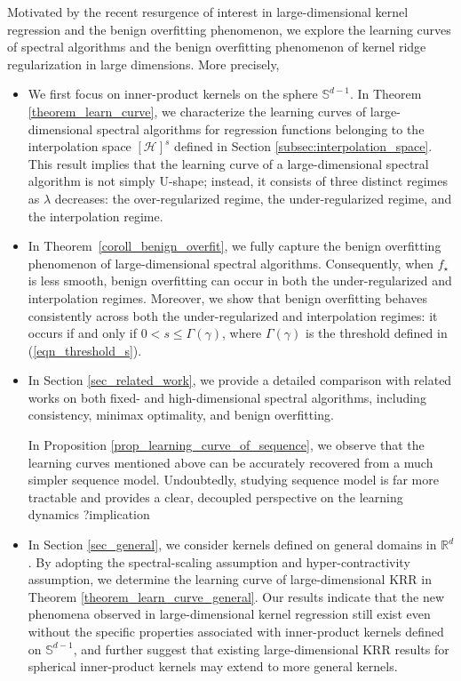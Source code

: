 \documentclass{article}
\theoremstyle{plain}
\theoremstyle{definition}
\theoremstyle{remark}
\newcommand{\calH}{\mathcal{H}}
\begin{document}
Motivated by the recent resurgence of interest in large-dimensional kernel regression and the benign overfitting phenomenon, we explore the learning curves of spectral algorithms and the benign overfitting phenomenon of kernel ridge regularization in large dimensions.  
More precisely,
\begin{itemize}
    \item We first focus on inner-product kernels on the sphere $\mathbb{S}^{d-1}$. 
    In Theorem \ref{theorem_learn_curve}, we characterize the learning curves of large-dimensional spectral algorithms for regression functions belonging to the interpolation space $[\calH]^{s}$ defined in Section \ref{subsec:interpolation_space}. 
    This result implies that the learning curve of a large-dimensional spectral algorithm is not simply U-shape; instead, it consists of three distinct regimes as $\lambda$ decreases: the over-regularized regime, the under-regularized regime, and the interpolation regime.

    \item In Theorem~\ref{coroll_benign_overfit}, we fully capture the benign overfitting phenomenon of large-dimensional spectral algorithms. 
    Consequently, when $f_{\star}$ is less smooth, benign overfitting can occur in both the under-regularized and interpolation regimes. 
    Moreover, we show that benign overfitting behaves consistently across both the under-regularized and interpolation regimes: it occurs if and only if $0<s \leq \Gamma(\gamma)$, where $\Gamma(\gamma)$ is the threshold defined in (\ref{eqn_threshold_s}).

    \item 
    In Section \ref{sec_related_work}, we provide a detailed comparison with related works on both fixed- and high-dimensional spectral algorithms, including consistency, minimax optimality, and benign overfitting. 
   
        In Proposition \ref{prop_learning_curve_of_sequence}, we observe that the learning curves mentioned above can be accurately recovered from a much simpler sequence model.
        Undoubtedly, studying sequence model is far more tractable and provides a clear, decoupled perspective on the learning dynamics  
    {\color{red} ?implication}
    

    \item In Section \ref{sec_general}, we consider kernels defined on general domains in $\mathbb{R}^{d}$. By adopting the spectral-scaling assumption and hyper-contractivity assumption, we determine the learning curve of large-dimensional KRR in Theorem \ref{theorem_learn_curve_general}. 
    Our results indicate that the new phenomena observed in large-dimensional kernel regression still exist even without the specific properties associated with inner-product kernels defined on $\mathbb{S}^{d-1}$, and further suggest that existing large-dimensional KRR results for spherical inner-product kernels may extend to more general kernels.

    
\end{itemize}
\fi 
\end{document}
